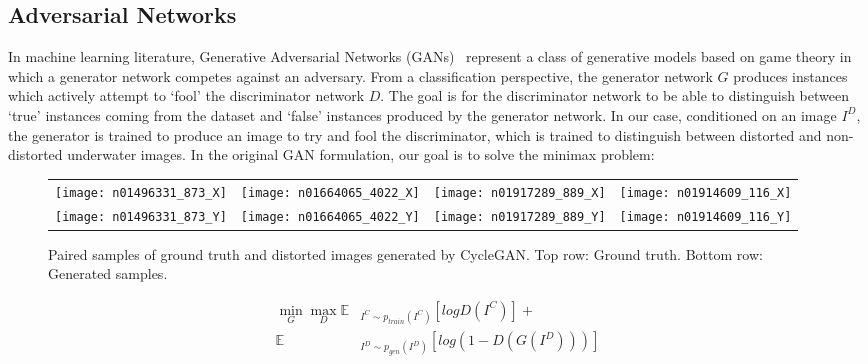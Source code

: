 \subsection{Adversarial Networks}
\label{sec:gans}
In machine learning literature, Generative Adversarial Networks 
(GANs)~\cite{goodfellow2014generative} represent a class of generative models based on game theory in which a generator network 
competes against an adversary. From a classification perspective, the generator network $G$ produces instances which actively 
attempt 
to `fool' the discriminator network $D$. The goal is for the discriminator network to be able to distinguish between `true' 
instances coming from the dataset and `false' instances produced by the generator network.
In our case, conditioned on an image $I^D$, the generator is trained to produce an image to try and fool the 
discriminator, which is trained to distinguish between distorted and non-distorted underwater images. In the original
GAN formulation, our goal is to solve the minimax problem:

\begin{figure}
\centering
\begin{tabular}{p{1.6cm} p{1.6cm} p{1.6cm} p{1.6cm}}
   \texttt{[image: n01496331\_873\_X]} &
   \texttt{[image: n01664065\_4022\_X]} &
   \texttt{[image: n01917289\_889\_X]} &
   \texttt{[image: n01914609\_116\_X]} \\
   \texttt{[image: n01496331\_873\_Y]} &
   \texttt{[image: n01664065\_4022\_Y]} &
   \texttt{[image: n01917289\_889\_Y]} &
   \texttt{[image: n01914609\_116\_Y]} \\
\end{tabular}
\caption{Paired samples of ground truth and distorted images generated by CycleGAN. Top row: Ground truth.
Bottom row: Generated samples.}
\label{fig:cgan_samples}
\vspace{-5mm}
\end{figure}


\begin{equation}
\begin{aligned}
   \min\limits_{G}\max\limits_{D} \mathbb{E} & _{I^C \sim p_{train}(I^C)} [logD(I^C)] + \\
   \mathbb{E} & _{I^D \sim p_{gen}(I^D)}[log(1 - D(G(I^D)))]
\end{aligned}
\end{equation}

